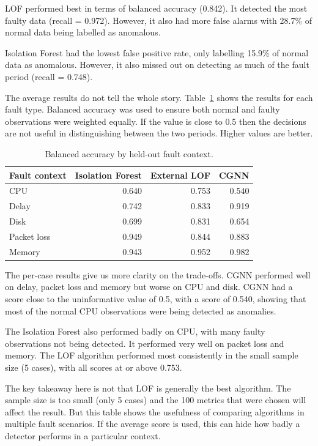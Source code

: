 LOF performed best in terms of balanced accuracy (0.842). It detected the most faulty data (recall = 0.972). However, it also had more false alarms with 28.7\% of normal data being labelled as anomalous.

Isolation Forest had the lowest false positive rate, only labelling 15.9\% of normal data as anomalous. However, it also missed out on detecting as much of the fault period (recall = 0.748).

The average results do not tell the whole story. Table~\ref{tab:h9-rcaeval-balanced-by-fault} shows the results for each fault type. Balanced accuracy was used to ensure both normal and faulty observations were weighted equally. If the value is close to 0.5 then the decisions are not useful in distinguishing between the two periods. Higher values are better.

\begin{table}[H]
    \centering
    \small
    \caption{Balanced accuracy by held-out fault context.}
    \label{tab:h9-rcaeval-balanced-by-fault}
    \begin{tabular}{|l|r|r|r|}
        \hline
        Fault context & Isolation Forest & External LOF & CGNN \\
        \hline
        CPU & 0.640 & 0.753 & 0.540 \\
        Delay & 0.742 & 0.833 & 0.919 \\
        Disk & 0.699 & 0.831 & 0.654 \\
        Packet loss & 0.949 & 0.844 & 0.883 \\
        Memory & 0.943 & 0.952 & 0.982 \\
        \hline
    \end{tabular}
\end{table}

The per-case results give us more clarity on the trade-offs. CGNN performed well on delay, packet loss and memory but worse on CPU and disk. CGNN had a score close to the uninformative value of 0.5, with a score of 0.540, showing that most of the normal CPU observations were being detected as anomalies.

The Isolation Forest also performed badly on CPU, with many faulty observations not being detected. It performed very well on packet loss and memory. The LOF algorithm performed most consistently in the small sample size (5 cases), with all scores at or above 0.753.

The key takeaway here is not that LOF is generally the best algorithm. The sample size is too small (only 5 cases) and the 100 metrics that were chosen will affect the result. But this table shows the usefulness of comparing algorithms in multiple fault scenarios. If the average score is used, this can hide how badly a detector performs in a particular context.

